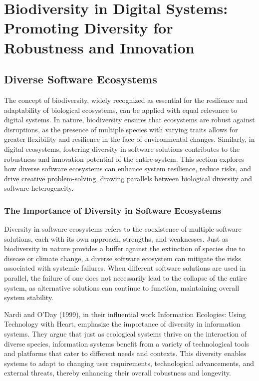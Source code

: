 \documentclass[12pt,twoside]{article}
\begin{document}
\section{Biodiversity in Digital Systems: Promoting Diversity for Robustness and Innovation}

\subsection{Diverse Software Ecosystems}

The concept of biodiversity, widely recognized as essential for the resilience and adaptability of biological ecosystems, can be applied with equal relevance to digital systems. In nature, biodiversity ensures that ecosystems are robust against disruptions, as the presence of multiple species with varying traits allows for greater flexibility and resilience in the face of environmental changes. Similarly, in digital ecosystems, fostering diversity in software solutions contributes to the robustness and innovation potential of the entire system. This section explores how diverse software ecosystems can enhance system resilience, reduce risks, and drive creative problem-solving, drawing parallels between biological diversity and software heterogeneity.

\subsubsection{The Importance of Diversity in Software Ecosystems}

Diversity in software ecosystems refers to the coexistence of multiple software solutions, each with its own approach, strengths, and weaknesses. Just as biodiversity in nature provides a buffer against the extinction of species due to disease or climate change, a diverse software ecosystem can mitigate the risks associated with systemic failures. When different software solutions are used in parallel, the failure of one does not necessarily lead to the collapse of the entire system, as alternative solutions can continue to function, maintaining overall system stability.

Nardi and O'Day (1999), in their influential work Information Ecologies: Using Technology with Heart, emphasize the importance of diversity in information systems. They argue that just as ecological systems thrive on the interaction of diverse species, information systems benefit from a variety of technological tools and platforms that cater to different needs and contexts. This diversity enables systems to adapt to changing user requirements, technological advancements, and external threats, thereby enhancing their overall robustness and longevity.
\end{document}
